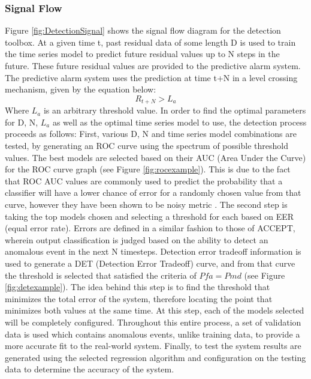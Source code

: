 \documentclass{acm_proc_article-sp}
\begin{document}
\subsubsection{Signal Flow}
Figure \ref{fig:DetectionSignal} shows the signal flow diagram for the detection toolbox. At a given time t, past residual data of some length D is used to train the time series model to predict future residual values up to N steps in the future. These future residual values are provided to the predictive alarm system. The predictive alarm system uses the prediction at time t+N in a level crossing mechanism, given by the equation below: \[R_{t+N} > L_a\]    Where \begin{math}L_a\end{math} is an arbitrary threshold value. In order to find the optimal parameters for D, N, \begin{math}L_a\end{math} as well as the optimal time series model to use, the detection process proceeds as follows: First, various D, N and time series model combinations are tested, by generating an ROC curve using the spectrum of possible threshold values. The best models are selected based on their AUC  (Area Under the Curve) for the ROC curve graph (see Figure \ref{fig:rocexample}). This is due to the fact that ROC AUC values are commonly used to predict the probability that a classifier will have a lower chance of error for a randomly chosen value from that curve, however they have been shown to be noisy metric \cite{roc-research}. The second step is taking the top models chosen and selecting a threshold for each based on EER (equal error rate). Errors are defined in a similar fashion to those of ACCEPT, wherein output classification is judged based on the ability to detect an anomalous event in the next N timesteps. Detection error tradeoff information is used to generate a DET (Detection Error Tradeoff) curve, and from that curve the threshold is selected that satisfied the criteria of \begin{math}Pfa = Pmd\end{math} (see Figure \ref{fig:detexample}). The idea behind this step is to find the threshold that minimizes the total error of the system, therefore locating the point that minimizes both values at the same time. At this step, each of the models selected will be completely configured. Throughout this entire process, a set of validation data is used which contains anomalous events, unlike training data, to provide a more accurate fit to the real-world system. Finally, to test the system results are generated using the selected regression algorithm and configuration on the testing data to determine the accuracy of the system.
\end{document}
